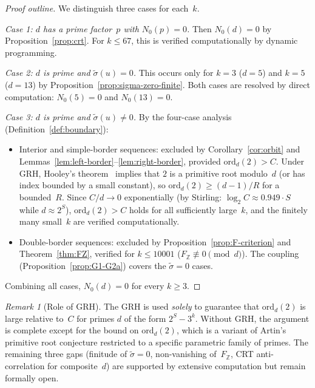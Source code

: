 \documentclass[12pt, a4paper]{amsart}
\theoremstyle{plain}
\theoremstyle{definition}
\theoremstyle{remark}
\newtheorem{remark}[theorem]{Remark}
\newcommand{\Z}{\mathbb{Z}}
\newcommand{\ord}{\mathrm{ord}}
\begin{document}
\begin{proof}[Proof outline]
  We distinguish three cases for each~$k$.

  \emph{Case 1: $d$ has a prime factor~$p$ with $N_0(p) = 0$.}
  Then $N_0(d) = 0$ by Proposition~\ref{prop:crt}.
  For $k \leq 67$, this is verified computationally by
  dynamic programming.

  \emph{Case 2: $d$ is prime and $\tilde\sigma(u) = 0$.}
  This occurs only for $k = 3$ ($d = 5$) and $k = 5$
  ($d = 13$) by Proposition~\ref{prop:sigma-zero-finite}.
  Both cases are resolved by direct computation:
  $N_0(5) = 0$ and $N_0(13) = 0$.

  \emph{Case 3: $d$ is prime and $\tilde\sigma(u) \neq 0$.}
  By the four-case analysis
  (Definition~\ref{def:boundary}):
  \begin{itemize}
    \item Interior and simple-border sequences: excluded
      by Corollary~\ref{cor:orbit} and
      Lemmas~\ref{lem:left-border}--\ref{lem:right-border},
      provided $\ord_d(2) > C$.
      Under GRH, Hooley's theorem~\cite{Hooley1967} implies
      that $2$ is a primitive root modulo~$d$
      (or has index bounded by a small constant),
      so $\ord_d(2) \geq (d-1)/R$ for a bounded~$R$.
      Since $C/d \to 0$ exponentially
      (by Stirling: $\log_2 C \approx 0.949 \cdot S$
      while $d \approx 2^S$),
      $\ord_d(2) > C$ holds for all sufficiently large~$k$,
      and the finitely many small~$k$ are verified
      computationally.
    \item Double-border sequences: excluded by
      Proposition~\ref{prop:F-criterion} and
      Theorem~\ref{thm:FZ}, verified for $k \leq 10001$
      ($F_\Z \not\equiv 0 \pmod{d}$).
      The coupling
      (Proposition~\ref{prop:G1-G2a}) covers the
      $\tilde\sigma = 0$ cases.
  \end{itemize}
  Combining all cases, $N_0(d) = 0$ for every $k \geq 3$.
\end{proof}

\begin{remark}[Role of GRH]\label{rem:grh-role}
  The GRH is used \emph{solely} to guarantee that
  $\ord_d(2)$ is large relative to~$C$ for primes $d$ of the
  form $2^S - 3^k$.
  Without GRH, the argument is complete
  except for the bound on $\ord_d(2)$, which is a variant
  of Artin's primitive root conjecture restricted to
  a specific parametric family of primes.
  The remaining three gaps (finitude of $\tilde\sigma = 0$,
  non-vanishing of~$F_\Z$, CRT anti-correlation for
  composite~$d$) are supported by extensive computation
  but remain formally open.
\end{remark}
\end{document}

